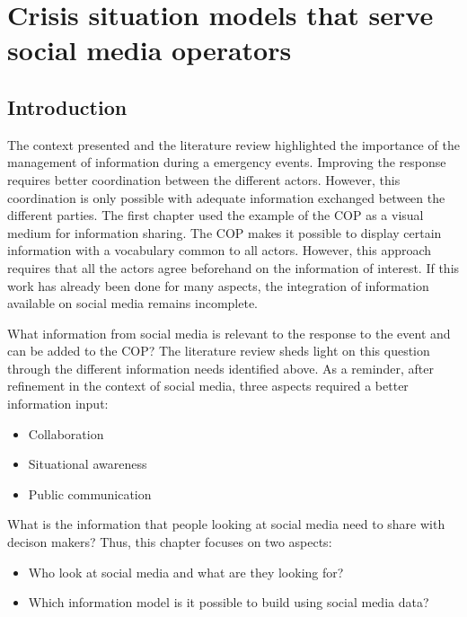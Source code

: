 \chapter{Crisis situation models that serve social media operators}

\section{Introduction}
The context presented and the literature review highlighted the importance of the management of information during a emergency events.
Improving the response requires better coordination between the different actors.
However, this coordination is only possible with adequate information exchanged between the different parties.
The first chapter used the example of the COP as a visual medium for information sharing.
The COP makes it possible to display certain information with a vocabulary common to all actors.
However, this approach requires that all the actors agree beforehand on the information of interest.
If this work has already been done for many aspects, the integration of information available on social media remains incomplete.

What information from social media is relevant to the response to the event and can be added to the COP?
The literature review sheds light on this question through the different information needs identified above.
As a reminder, after refinement in the context of social media, three aspects required a better information input:

\begin{itemize}
    \item Collaboration
    \item Situational awareness
    \item Public communication
\end{itemize}

What is the information that people looking at social media need to share with decison makers?
Thus, this chapter focuses on two aspects:

\begin{itemize}
    \item Who look at social media and what are they looking for?
    \item Which information model is it possible to build using social media data?
\end{itemize}

